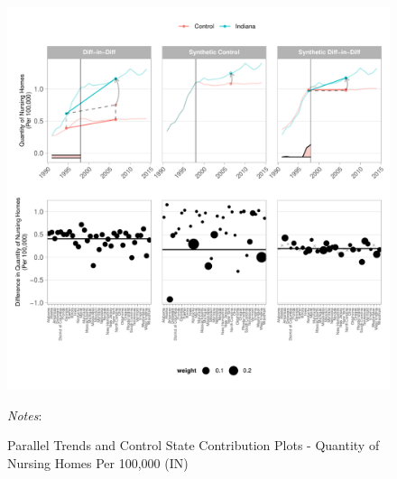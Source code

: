 \documentclass[12pt]{article}
\begin{document}
\newpage
\begin{figure}[t]
	\begin{center}
	\caption{\centering Parallel Trends and Control State Contribution Plots - Quantity of Nursing Homes Per 100,000 (IN)}
    \includegraphics[width=\textwidth,keepaspectratio]{q_nursing_homes_plots_IN.pdf}
    \end{center}
    \footnotesize
		\textit{Notes}:
\end{figure}
\clearpage
\end{document}

